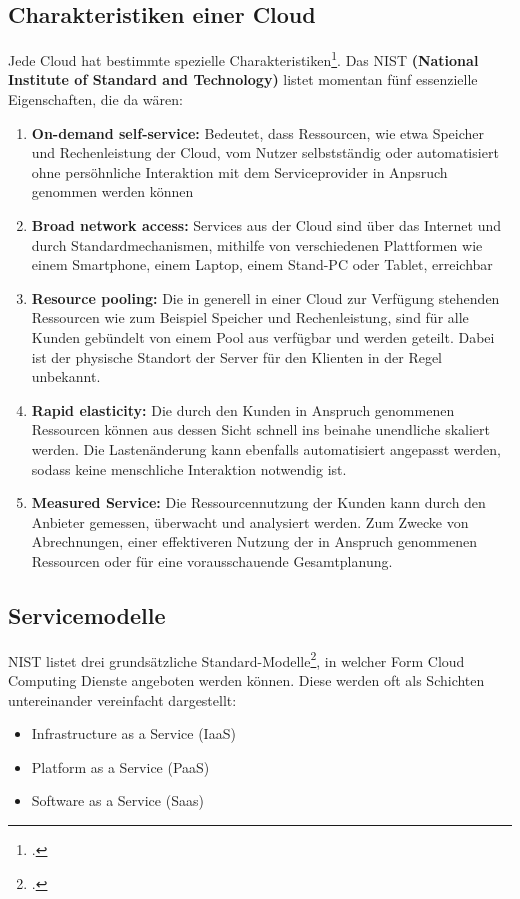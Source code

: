 \subsection{Charakteristiken einer Cloud}
Jede Cloud hat bestimmte spezielle Charakteristiken\footcite{cloud-computing}. Das NIST \textbf{(National Institute of Standard and Technology)} listet
momentan fünf essenzielle Eigenschaften, die da wären:
\begin{enumerate}
	\item \textbf{On-demand self-service: } Bedeutet, dass Ressourcen, wie etwa Speicher und Rechenleistung der Cloud, vom Nutzer selbstständig oder automatisiert 
ohne persöhnliche Interaktion mit dem Serviceprovider in Anpsruch genommen werden können
	\item \textbf{Broad network access: } Services aus der Cloud sind über das Internet und durch Standardmechanismen, mithilfe von verschiedenen Plattformen wie einem Smartphone, einem Laptop, einem Stand-PC oder Tablet, erreichbar
	\item \textbf{Resource pooling: } Die in generell in einer Cloud zur Verfügung stehenden Ressourcen wie zum Beispiel Speicher und Rechenleistung, sind für alle Kunden gebündelt von einem Pool aus verfügbar und werden geteilt. Dabei ist der physische Standort der Server für den Klienten in der Regel unbekannt.
	\item \textbf{Rapid elasticity: } Die durch den Kunden in Anspruch genommenen Ressourcen können aus dessen Sicht schnell ins beinahe unendliche skaliert werden. Die Lastenänderung
kann ebenfalls automatisiert angepasst werden, sodass keine menschliche Interaktion notwendig ist.
	\item \textbf{Measured Service: } Die Ressourcennutzung der Kunden kann durch den Anbieter gemessen, überwacht und analysiert werden. Zum Zwecke von Abrechnungen, einer effektiveren
Nutzung der in Anspruch genommenen Ressourcen oder für eine vorausschauende Gesamtplanung.
\end{enumerate}

\subsection{Servicemodelle}
NIST listet drei grundsätzliche Standard-Modelle\footcite{cloud-servicemodelle}, in welcher Form Cloud Computing Dienste angeboten werden können. Diese werden oft als Schichten untereinander vereinfacht dargestellt:
\begin{itemize}
	\item Infrastructure as a Service (IaaS)
	\item Platform as a Service (PaaS)
	\item Software as a Service (Saas)
\end{itemize}

